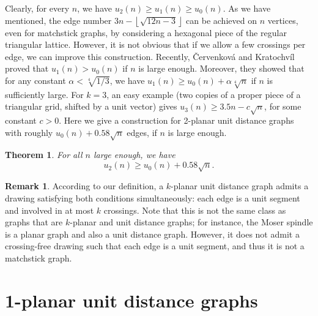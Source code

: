 \documentclass[10pt]{article}
\newtheorem{theorem}{Theorem}
\theoremstyle{definition}
\newtheorem{remark}{Remark}
\begin{document}
Clearly, for every $n$, we have $u_2(n) \geq u_1(n)\geq u_0(n)$. 
As we have mentioned, the edge number $3n - \left\lfloor \sqrt{12n - 3}\right\rfloor$ 
can be achieved on $n$ vertices, even for matchstick graphs, 
by considering a hexagonal piece of the regular triangular lattice. 
However, it is not obvious that if we allow a few crossings per edge, 
we can improve this construction. Recently, \v{C}ervenkov\'a and Kratochv\'il 
\cite{CK25} proved that $u_1(n)> u_0(n)$ if $n$ is large enough. Moreover, they showed that for any constant $\alpha< \sqrt[4]{1/3}$, we have
$u_1(n)\ge u_0(n)+\alpha\sqrt[4]{n}$ if $n$ is sufficiently large. 
For $k=3$, an easy example (two copies of a proper piece of a triangular grid, shifted by a unit vector) gives $u_3(n)\geq 3.5n - c\sqrt{n}$, for some constant $c>0$. 
Here we give a construction for 2-planar unit distance graphs with roughly $u_0(n)+0.58 \sqrt{n}$ edges, if $n$ is large enough.
\begin{theorem} \label{thm_construction}
For all $n$ large enough, we have
    $$u_2(n) \geq u_0(n)+0.58\sqrt{n}.$$
    
\end{theorem}


\begin{remark}
According to our definition, 
a $k$-planar unit distance graph admits a drawing satisfying both conditions simultaneously: each edge is a unit segment and  involved in at most $k$ crossings. 
Note that this is not the same class as graphs that are $k$-planar and unit distance graphs; 
for instance, the Moser spindle is a planar graph and also a unit distance graph. 
However, it does not admit a crossing-free drawing such that each edge is a unit segment, and thus it is not a matchstick graph.
\end{remark}


\section{1-planar unit distance graphs}
\end{document}
